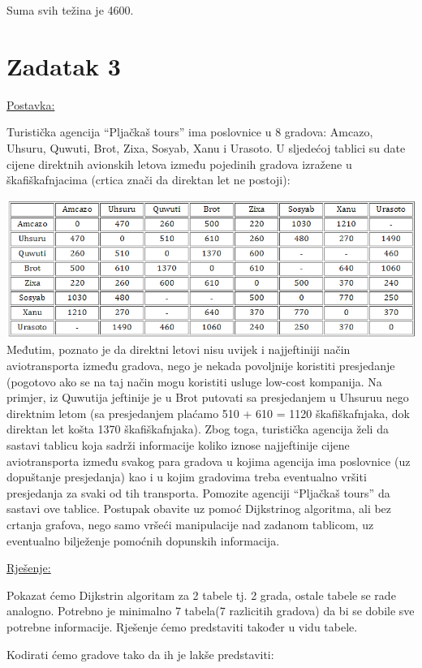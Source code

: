 \documentclass[12pt]{article}
\begin{document}
Suma svih težina je 4600.
\newpage
\section*{Zadatak 3\label{Z3}}
\underline{Postavka:}

Turistička agencija “Pljačkaš tours” ima poslovnice u 8 gradova: Amcazo, Uhsuru, Quwuti, Brot, Zixa, Sosyab, Xanu i Urasoto. U sljedećoj tablici su date cijene direktnih avionskih letova između pojedinih gradova izražene u škafiškafnjacima (crtica znači da direktan let ne postoji):

\includegraphics[width=\linewidth]{table.PNG}
\\
Međutim, poznato je da direktni letovi nisu uvijek i najjeftiniji način aviotransporta između gradova, nego je nekada povoljnije koristiti presjedanje (pogotovo ako se na taj način mogu koristiti usluge low-cost kompanija. Na primjer, iz Quwutija jeftinije je u Brot putovati sa presjedanjem u Uhsuruu nego direktnim letom (sa presjedanjem plaćamo 510 + 610 = 1120 škafiškafnjaka, dok direktan let košta 1370 škafiškafnjaka). Zbog toga, turistička agencija želi da sastavi tablicu koja sadrži informacije koliko iznose najjeftinije cijene aviotransporta između svakog para gradova u kojima agencija ima poslovnice (uz dopuštanje presjedanja) kao i u kojim gradovima treba eventualno vršiti presjedanja za svaki od tih transporta. Pomozite agenciji “Pljačkaš tours” da sastavi ove tablice. Postupak obavite uz pomoć Dijkstrinog algoritma, ali bez crtanja grafova, nego samo vršeći manipulacije nad zadanom tablicom, uz eventualno bilježenje pomoćnih dopunskih informacija.


\underline{Rješenje:}
\newpage

Pokazat ćemo Dijkstrin algoritam za 2 tabele tj. 2 grada, ostale tabele se rade analogno. Potrebno je minimalno 7 tabela(7 razlicitih gradova) da bi se dobile sve potrebne informacije. Rješenje ćemo predstaviti također u vidu tabele.

Kodirati ćemo gradove tako da ih je lakše predstaviti:
\end{document}
